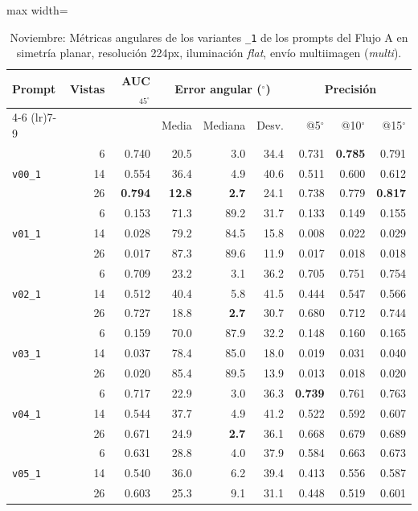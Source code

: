 \begin{table}[htbp]
\centering
\caption{Noviembre: Métricas angulares de los variantes \texttt{\_1} de los prompts del Flujo A en simetría planar, resolución 224px, iluminación \textit{flat}, envío multiimagen (\textit{multi}).}
\label{tab:nov_plane_variantes_1_angular}
\begin{lrbox}{\tablebox}
\begin{adjustbox}{max width=\textwidth}
\begin{tabular}{lrrrrrrrr}
\toprule
\multirow{2}{*}{Prompt} & \multirow{2}{*}{Vistas} & \multirow{2}{*}{AUC$_{45^\circ}$} & \multicolumn{3}{c}{Error angular ($^\circ$)} & \multicolumn{3}{c}{Precisión} \\
\cmidrule(lr){4-6} \cmidrule(lr){7-9}
 &  &  & Media & Mediana & Desv. & @5$^\circ$ & @10$^\circ$ & @15$^\circ$ \\
\midrule
\multirow{3}{*}{\texttt{v00\_1}} & 6 & 0.740 & 20.5 & 3.0 & 34.4 & 0.731 & \textbf{0.785} & 0.791 \\
 & 14 & 0.554 & 36.4 & 4.9 & 40.6 & 0.511 & 0.600 & 0.612 \\
 & 26 & \textbf{0.794} & \textbf{12.8} & \textbf{2.7} & 24.1 & 0.738 & 0.779 & \textbf{0.817} \\
\midrule
\multirow{3}{*}{\texttt{v01\_1}} & 6 & 0.153 & 71.3 & 89.2 & 31.7 & 0.133 & 0.149 & 0.155 \\
 & 14 & 0.028 & 79.2 & 84.5 & 15.8 & 0.008 & 0.022 & 0.029 \\
 & 26 & 0.017 & 87.3 & 89.6 & 11.9 & 0.017 & 0.018 & 0.018 \\
\midrule
\multirow{3}{*}{\texttt{v02\_1}} & 6 & 0.709 & 23.2 & 3.1 & 36.2 & 0.705 & 0.751 & 0.754 \\
 & 14 & 0.512 & 40.4 & 5.8 & 41.5 & 0.444 & 0.547 & 0.566 \\
 & 26 & 0.727 & 18.8 & \textbf{2.7} & 30.7 & 0.680 & 0.712 & 0.744 \\
\midrule
\multirow{3}{*}{\texttt{v03\_1}} & 6 & 0.159 & 70.0 & 87.9 & 32.2 & 0.148 & 0.160 & 0.165 \\
 & 14 & 0.037 & 78.4 & 85.0 & 18.0 & 0.019 & 0.031 & 0.040 \\
 & 26 & 0.020 & 85.4 & 89.5 & 13.9 & 0.013 & 0.018 & 0.020 \\
\midrule
\multirow{3}{*}{\texttt{v04\_1}} & 6 & 0.717 & 22.9 & 3.0 & 36.3 & \textbf{0.739} & 0.761 & 0.763 \\
 & 14 & 0.544 & 37.7 & 4.9 & 41.2 & 0.522 & 0.592 & 0.607 \\
 & 26 & 0.671 & 24.9 & \textbf{2.7} & 36.1 & 0.668 & 0.679 & 0.689 \\
\midrule
\multirow{3}{*}{\texttt{v05\_1}} & 6 & 0.631 & 28.8 & 4.0 & 37.9 & 0.584 & 0.663 & 0.673 \\
 & 14 & 0.540 & 36.0 & 6.2 & 39.4 & 0.413 & 0.556 & 0.587 \\
 & 26 & 0.603 & 25.3 & 9.1 & 31.1 & 0.448 & 0.519 & 0.601 \\
\bottomrule
\end{tabular}
\end{adjustbox}
\end{lrbox}
\usebox{\tablebox}


\end{table}
